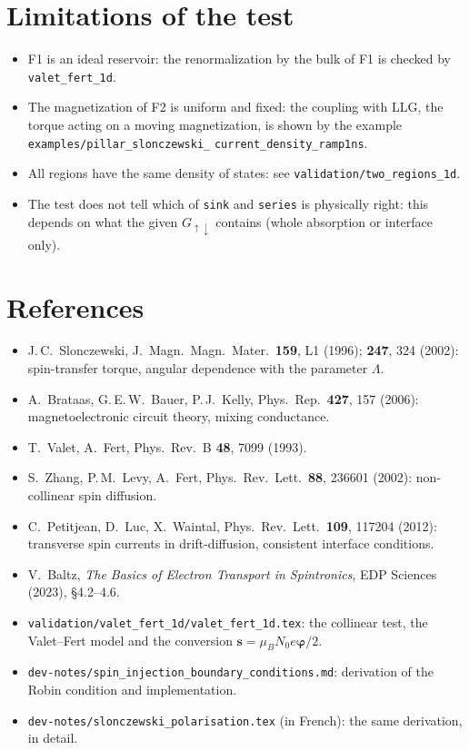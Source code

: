 \documentclass[11pt,a4paper]{article}
\newcommand{\vs}{\bm{s}}
\newcommand{\vphi}{\bm{\varphi}}
\begin{document}
\section{Limitations of the test}

\begin{itemize}
  \item F1 is an ideal reservoir: the renormalization by the bulk of F1 is
    checked by \texttt{valet\_fert\_1d}.
  \item The magnetization of F2 is uniform and fixed: the coupling with
    LLG, the torque acting on a moving magnetization, is shown by the
    example \texttt{examples/}\allowbreak\texttt{pillar\_slonczewski\_}\allowbreak
    \texttt{current\_density\_ramp1ns}.
  \item All regions have the same density of states: see
    \texttt{validation/two\_regions\_1d}.
  \item The test does not tell which of \texttt{sink} and \texttt{series}
    is physically right: this depends on what the given
    $G_{\uparrow\downarrow}$ contains (whole absorption or interface
    only).
\end{itemize}

\section*{References}

\begin{itemize}
  \item J.\,C.~Slonczewski, J.~Magn.\ Magn.\ Mater.\ \textbf{159}, L1
    (1996); \textbf{247}, 324 (2002): spin-transfer torque, angular
    dependence with the parameter $\Lambda$.
  \item A.~Brataas, G.\,E.\,W.~Bauer, P.\,J.~Kelly, Phys.\ Rep.\
    \textbf{427}, 157 (2006): magnetoelectronic circuit theory, mixing
    conductance.
  \item T.~Valet, A.~Fert, Phys.\ Rev.\ B \textbf{48}, 7099 (1993).
  \item S.~Zhang, P.\,M.~Levy, A.~Fert, Phys.\ Rev.\ Lett.\ \textbf{88},
    236601 (2002): non-collinear spin diffusion.
  \item C.~Petitjean, D.~Luc, X.~Waintal, Phys.\ Rev.\ Lett.\
    \textbf{109}, 117204 (2012): transverse spin currents in
    drift-diffusion, consistent interface conditions.
  \item V.~Baltz, \emph{The Basics of Electron Transport in Spintronics},
    EDP Sciences (2023), §4.2--4.6.
  \item \texttt{validation/valet\_fert\_1d/valet\_fert\_1d.tex}: the
    collinear test, the Valet--Fert model and the conversion
    $\vs = \mu_BN_0e\vphi/2$.
  \item \texttt{dev-notes/spin\_injection\_boundary\_conditions.md}:
    derivation of the Robin condition and implementation.
  \item \texttt{dev-notes/slonczewski\_polarisation.tex} (in French): the
    same derivation, in detail.
\end{itemize}
\end{document}
